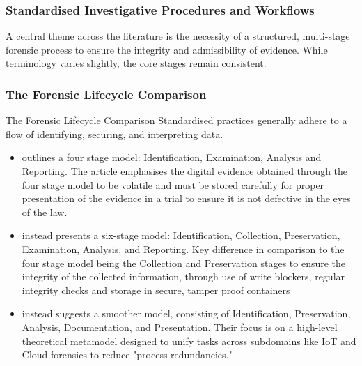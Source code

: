 \documentclass[12pt,a4paper]{article}
\begin{document}
\subsubsection{Standardised Investigative Procedures and Workflows}
A central theme across the literature is the necessity of a structured, multi-stage forensic process to ensure the integrity and admissibility of evidence. While terminology varies slightly, the core stages remain consistent.

\subsubsection{The Forensic Lifecycle Comparison}

The Forensic Lifecycle Comparison
Standardised practices generally adhere to a flow of identifying, securing, and interpreting data.
\begin{itemize}
\item \textbf{\cite{ilyas2024role}} outlines a four stage model: Identification, Examination, Analysis and Reporting. The article emphasises the digital evidence obtained through the four stage model to be volatile and must be stored carefully for proper presentation of the evidence in a trial to ensure it is not defective in the eyes of the law.
\item \textbf{\cite{hassan2025}} instead presents a six-stage model: Identification, Collection, Preservation, Examination, Analysis, and Reporting. Key difference in comparison to the four stage model being the Collection and Preservation stages to ensure the integrity of the collected information, through use of write blockers, regular integrity checks and storage in secure, tamper proof containers
\item \textbf{\cite{ARIF2025104296}} instead suggests a smoother model, consisting of Identification, Preservation, Analysis, Documentation, and Presentation. Their focus is on a high-level theoretical metamodel designed to unify tasks across subdomains like IoT and Cloud forensics to reduce "process redundancies."

\end{itemize}
\end{document}
